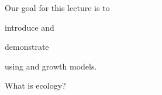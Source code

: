 \documentclass[t]{beamer}
\begin{document}

\begin{frame}{Our goal for this lecture is to }

	
	\hangpara introduce  and
	
	\hangpara demonstrate 
	
	\hangpara using  and  growth models.

\end{frame}
%
%
%
%
%
{
\begin{frame}[b]{\hfill What is ecology?}
	\tiny\textcolor{white}{Jeff Taylor, Wikimedia, .}%
\end{frame}
}
\end{document}
